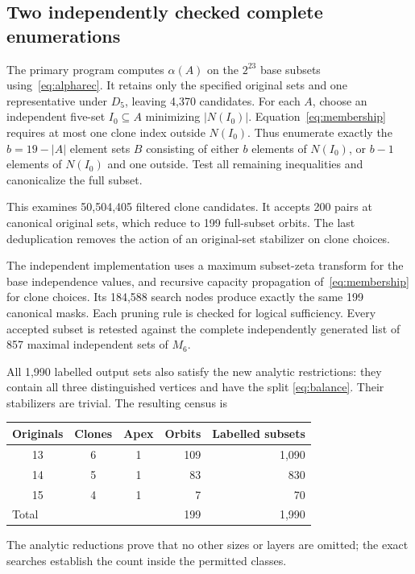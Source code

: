 \documentclass[11pt,letterpaper]{article}
\theoremstyle{remark}
\newcommand{\abs}[1]{\lvert #1\rvert}
\begin{document}
\subsection{Two independently checked complete enumerations}
The primary program computes $\alpha(A)$ on the $2^{23}$ base subsets
using~\eqref{eq:alpharec}. It retains only the specified original sets
and one representative under $D_5$, leaving 4,370 candidates.
For each $A$, choose an independent five-set $I_0\subseteq A$ minimizing
$\abs{N(I_0)}$. Equation~\eqref{eq:membership} requires at most one clone
index outside $N(I_0)$. Thus enumerate exactly the $b=19-\abs A$ element
sets $B$ consisting of either $b$ elements of $N(I_0)$, or $b-1$ elements
of $N(I_0)$ and one outside. Test all remaining inequalities and
canonicalize the full subset.

This examines 50,504,405 filtered clone candidates. It accepts 200 pairs
at canonical original sets, which reduce to 199 full-subset orbits.
The last deduplication removes the action of an original-set stabilizer
on clone choices.

The independent implementation uses a maximum subset-zeta transform for
the base independence values, and recursive capacity propagation
of~\eqref{eq:membership} for clone choices. Its 184,588 search nodes
produce exactly the same 199 canonical masks. Each pruning rule is
checked for logical sufficiency. Every accepted subset is retested
against the complete independently generated list of 857 maximal
independent sets of $M_6$.

All 1,990 labelled output sets also satisfy the new analytic restrictions:
they contain all three distinguished vertices and have the split
\eqref{eq:balance}. Their stabilizers are trivial. The resulting census is
\begin{center}
\setlength{\tabcolsep}{9pt}
\begin{tabular}{@{}ccc rr@{}}
\toprule
Originals & Clones & Apex & Orbits & Labelled subsets\\
\midrule
13 & 6 & 1 & 109 & 1,090\\
14 & 5 & 1 & 83 & 830\\
15 & 4 & 1 & 7 & 70\\
\midrule
\multicolumn{3}{l}{Total} & 199 & 1,990\\
\bottomrule
\end{tabular}
\end{center}
The analytic reductions prove that no other sizes or layers are omitted;
the exact searches establish the count inside the permitted classes.
\end{document}
